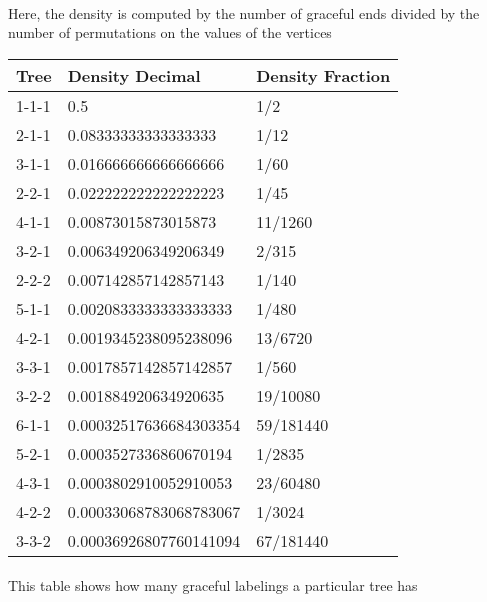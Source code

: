 \documentclass{article}
\begin{document}
\paragraph{} Here, the density is computed by the number of             graceful ends divided by the number of permutations on the             values of the vertices
\begin{center}
              \begin{tabular}{| l | l | l |}
              \hline
              Tree & Density Decimal & Density Fraction \\ 
              \hline 
1-1-1 & 0.5 & 1/2\\
\hline
2-1-1 & 0.08333333333333333 & 1/12\\
\hline
3-1-1 & 0.016666666666666666 & 1/60\\
\hline
2-2-1 & 0.022222222222222223 & 1/45\\
\hline
4-1-1 & 0.00873015873015873 & 11/1260\\
\hline
3-2-1 & 0.006349206349206349 & 2/315\\
\hline
2-2-2 & 0.007142857142857143 & 1/140\\
\hline
5-1-1 & 0.0020833333333333333 & 1/480\\
\hline
4-2-1 & 0.0019345238095238096 & 13/6720\\
\hline
3-3-1 & 0.0017857142857142857 & 1/560\\
\hline
3-2-2 & 0.001884920634920635 & 19/10080\\
\hline
6-1-1 & 0.00032517636684303354 & 59/181440\\
\hline
5-2-1 & 0.0003527336860670194 & 1/2835\\
\hline
4-3-1 & 0.0003802910052910053 & 23/60480\\
\hline
4-2-2 & 0.00033068783068783067 & 1/3024\\
\hline
3-3-2 & 0.00036926807760141094 & 67/181440\\
\hline
\hline
              \end{tabular}
              \end{center}\paragraph{} This table shows how many graceful labelings             a particular tree has
\end{document}
